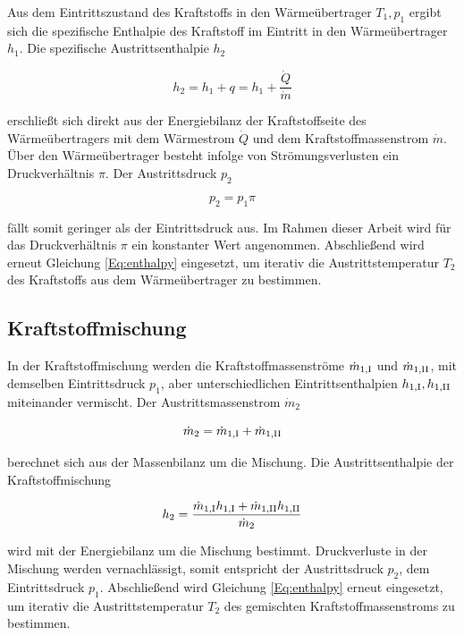 Aus dem Eintrittszustand des Kraftstoffs in den Wärmeübertrager $T_1, p_1$ ergibt sich die spezifische Enthalpie des Kraftstoff im Eintritt in den Wärmeübertrager $h_1$. Die spezifische Austrittsenthalpie $h_2$

\begin{equation}\label{Eq:energy-hx}
	h_2=h_1 +q=h_1+\frac{\dot{Q}}{\dot{m}}
\end{equation}

erschließt sich direkt aus der Energiebilanz der Kraftstoffseite des Wärmeübertragers mit dem Wärmestrom $\dot{Q}$ und dem Kraftstoffmassenstrom $\dot{m}$. Über den Wärmeübertrager besteht infolge von Strömungsverlusten ein Druckverhältnis $\pi$. Der Austrittsdruck $p_2$

\begin{equation}\label{Eq:pressuredrop}
	p_2 = p_1 \pi
\end{equation}

fällt somit geringer als der Eintrittsdruck aus. Im Rahmen dieser Arbeit wird für das Druckverhältnis $\pi$ ein konstanter Wert angenommen. Abschließend wird erneut Gleichung \ref{Eq:enthalpy} eingesetzt, um iterativ die Austrittstemperatur $T_2$ des Kraftstoffs aus dem Wärmeübertrager zu bestimmen.

\subsection{Kraftstoffmischung}

In der Kraftstoffmischung werden die Kraftstoffmassenströme $\dot{m}_{1,\mathrm{\rom{1}}}$ und $\dot{m}_{1,\mathrm{\rom{2}}}$, mit demselben Eintrittsdruck $p_1$, aber unterschiedlichen Eintrittsenthalpien $h_{1,\mathrm{\rom{1}}}, h_{1,\mathrm{\rom{2}}}$ miteinander vermischt. Der Austrittsmassenstrom $\dot{m}_2$

\begin{equation}\label{Eq:mass}
	\dot{m}_2 = \dot{m}_{1,\mathrm{\rom{1}}}+\dot{m}_{1,\mathrm{\rom{2}}}
\end{equation}

berechnet sich aus der Massenbilanz um die Mischung. Die Austrittsenthalpie der Kraftstoffmischung 

\begin{equation}\label{Eq:energy-mix}
	h_{2} = \frac{\dot{m}_{1,\mathrm{\rom{1}}}h_{1,\mathrm{\rom{1}}}+\dot{m}_{1,\mathrm{\rom{2}}}h_{1,\mathrm{\rom{2}}}}{\dot{m}_2}
\end{equation}

wird mit der Energiebilanz um die Mischung bestimmt. Druckverluste in der Mischung werden vernachlässigt, somit entspricht der Austrittsdruck $p_2$, dem Eintrittsdruck $p_1$. Abschließend wird Gleichung \ref{Eq:enthalpy} erneut eingesetzt, um iterativ die Austrittstemperatur $T_2$ des gemischten Kraftstoffmassenstroms zu bestimmen. 

